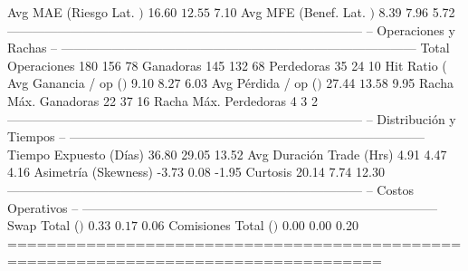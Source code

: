   Avg MAE (Riesgo Lat. $)     $          16.60  $          12.55  $           7.10
  Avg MFE (Benef. Lat. $)     $           8.39  $           7.96  $           5.72
------------------------------------------------------------------------------------
  -- Operaciones y Rachas --
------------------------------------------------------------------------------------
  Total Operaciones                        180               156                78
  Ganadoras                                145               132                68
  Perdedoras                                35                24                10
  Hit Ratio (%
  Avg Ganancia / op ($)       $           9.10  $           8.27  $           6.03
  Avg Pérdida / op ($)        $          27.44  $          13.58  $           9.95
  Racha Máx. Ganadoras                      22                37                16
  Racha Máx. Perdedoras                      4                 3                 2
------------------------------------------------------------------------------------
  -- Distribución y Tiempos --
------------------------------------------------------------------------------------
  Tiempo Expuesto (Días)                 36.80             29.05             13.52
  Avg Duración Trade (Hrs)                4.91              4.47              4.16
  Asimetría (Skewness)                   -3.73              0.08             -1.95
  Curtosis                               20.14              7.74             12.30
------------------------------------------------------------------------------------
  -- Costos Operativos --
------------------------------------------------------------------------------------
  Swap Total ($)              $           0.33  $           0.17  $           0.06
  Comisiones Total ($)        $           0.00  $           0.00  $           0.20
====================================================================================


